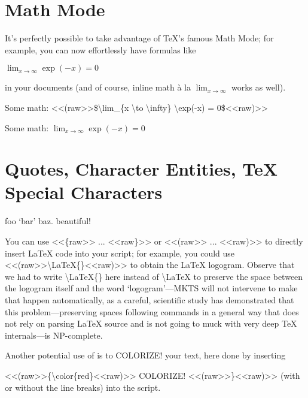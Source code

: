\section{Math Mode
}
\begin{multicols}{2}It’s perfectly possible to take advantage of
\TeX{}'s famous Math Mode; for example,
you can now effortlessly have formulas like\mktsShowpar\par
$\lim_{x \to \infty} \exp(-x) = 0$\mktsShowpar\par
in your documents (and of course, inline math {\mktsStyleItalic{}à la\/}
$\lim_{x \to \infty}$ works as well).\mktsShowpar\par
\end{multicols}
Some math: {\mktsStyleCode{}<<(raw>>\$\textbackslash{}lim\_\{x \textbackslash{}to \textbackslash{}infty\} \textbackslash{}exp(-x) = 0\$<<raw)>>}\mktsShowpar\par
Some math: $\lim_{x \to \infty} \exp(-x) = 0$
\begin{multicols}{2}\mktsShowpar\par
\end{multicols}
\section{Quotes, Character Entities, \TeX{} Special Characters
}
\begin{multicols}{2}foo ‘bar’ baz.  beautiful!\mktsShowpar\par
\mktsShowpar\par
You can use {\mktsStyleCode{}<<\{raw>> ... <<raw\}>>} or {\mktsStyleCode{}<<(raw>> ... <<raw)>>} to directly insert \LaTeX{}
code into your script; for example, you could
use {\mktsStyleCode{}<<(raw>>\textbackslash{}LaTeX\{\}<<raw)>>}
to obtain the \LaTeX{} logogram.
Observe that we had to write {\mktsStyleCode{}\textbackslash{}LaTeX\{\}} here instead of {\mktsStyleCode{}\textbackslash{}LaTeX} to preserve the space between the logogram itself and
the word ‘logogram’—{\mktsStyleBold{}MKTS} will not intervene to make that happen
automatically, as a careful, scientific study has demonstrated
that this problem—preserving spaces following commands in a
general way that does not rely on parsing \LaTeX{}
source and is not going to muck with very deep
\TeX{}
internals—is NP-complete.\mktsShowpar\par
Another potential use of  is to {\color{red}COLORIZE!} your text, here done by inserting\mktsShowpar\par
\begingroup\obeyalllines\mktsStyleCode{}<<(raw>>\{\textbackslash{}color\{red\}<<raw)>>
COLORIZE!
<<(raw>>\}<<raw)>>
\endgroup{}(with or without the line breaks) into the script.\mktsShowpar\par
\end{multicols}
